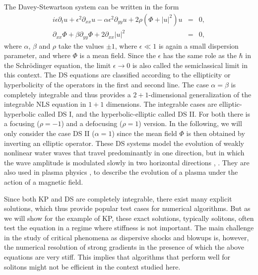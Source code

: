 \documentclass[final]{siamltex}
\begin{document}
The Davey-Stewartson system can be written in the form
\begin{equation}
    \label{DSII}
\begin{array}{ccc}
i\epsilon 
\partial_{t}u+\epsilon^{2}\partial_{xx}u-\alpha\epsilon^{2}\partial_{yy}u+2\rho\left(\Phi+\left|u\right|^{2}\right)u & = & 0,
\\
\partial_{xx}\Phi+\beta\partial_{yy}\Phi+2\partial_{xx}\left|u\right|^{2} & = & 0,
\end{array}
\end{equation}
where $\alpha$, $\beta$ and $\rho$ take the values $\pm1$, where
$\epsilon\ll1$ is again a small dispersion
parameter, and where $\Phi$ is a mean field. Since the $\epsilon$ has the 
same role as the $\hbar$ in the Schr\"odinger equation, the limit 
$\epsilon\to0$ is also called the semiclassical limit in this 
context. The DS equations are 
classified \cite{GS} according to the ellipticity or hyperbolicity of the 
operators in the first and second line. The case $\alpha=\beta$ is 
completely integrable  \cite{AH} and thus provides a $2+1$-dimensional 
generalization of the integrable NLS equation in $1+1$ dimensions. 
The integrable cases are
elliptic-hyperbolic  called DS I, and the hyperbolic-elliptic 
called DS II. For both there is a focusing ($\rho=-1$) and a 
defocusing ($\rho=1$) version. 
 In the following, we 
will only consider the case DS II ($\alpha=1$) since the mean field 
$\Phi$ is then obtained by inverting an elliptic operator. 
These DS systems model the evolution of weakly nonlinear water waves that
travel predominantly in one direction, but in which the wave amplitude
is modulated slowly in two horizontal directions \cite{DS}, \cite{DR}. They are also used
in plasma physics \cite{NAS,NAS94}, to describe the evolution of a plasma under the
action of a magnetic field. 

Since both KP and DS are completely integrable, there exist many
explicit solutions, which thus provide popular test cases for numerical
algorithms. But as we will show for the example of KP, these exact 
solutions, typically solitons, often test the equation in a 
regime where stiffness is not important. The main challenge in the study of critical phenomena as 
dispersive shocks and blowups is, however, the numerical resolution 
of strong gradients in the presence of which the above 
equations are very stiff. This implies that algorithms that perform well 
for solitons might not be efficient in the context studied here. 
\end{document}
